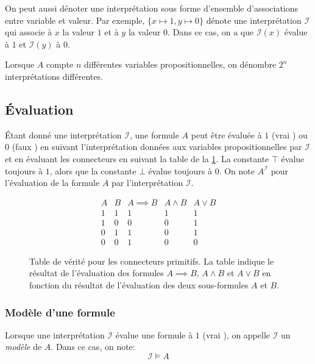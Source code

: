 On peut aussi dénoter une interprétation sous forme d'ensemble d'associations entre variable et valeur.
Par exemple, $\{ x \mapsto 1, y \mapsto 0 \}$ dénote une interprétation $\mathcal{I}$ qui associe à $x$ la valeur $1$ et à $y$ la valeur $0$. Dans ce cas, on a que $\mathcal{I}(x)$ évalue à $1$ et $\mathcal{I}(y)$ à $0$.

Lorsque $A$ compte $n$ différentes variables propositionnelles, on dénombre $2^n$ interprétations différentes.

\subsection{Évaluation}

Étant donné une interprétation $\mathcal{I}$, une formule $A$ peut être évaluée à $1$ (\og vrai \fg) ou $0$ (\og faux \fg)
en suivant l'interprétation données aux variables propositionnelles par $\mathcal{I}$ et
en évaluant les connecteurs en suivant la table de la \cref{fig_tables_connecteurs}.
La constante $\top$ évalue toujours à $1$, alors que la constante $\bot$ évalue toujours à $0$.
On note $A^{\mathcal{I}}$ pour l'évaluation de la formule $A$ par l'interprétation $\mathcal{I}$.

\begin{figure}[h]

\begin{displaymath}
\begin{array}{cc|ccc}
A & B & A \implies B & A \wedge B & A \vee B\\
\hline
1 & 1 & 1 & 1 & 1\\
1 & 0 & 0 & 0 & 1\\
0 & 1 & 1 & 0 & 1\\
0 & 0 & 1 & 0 & 0
\end{array}
\end{displaymath}

\caption{Table de vérité pour les connecteurs primitifs. La table indique le résultat de l'évaluation des formules $A \implies B$, $A \wedge B$ et $A \vee B$ en fonction du résultat de l'évaluation des deux sous-formules $A$ et $B$.}
\label{fig_tables_connecteurs}
\end{figure}

\subsubsection{Modèle d'une formule}

Lorsque une interprétation $\mathcal{I}$ évalue une formule à $1$ (\og vrai \fg), on appelle $\mathcal{I}$ un \textit{modèle} de $A$.
Dans ce cas, on note:
\[
\mathcal{I} \vDash A
\]

